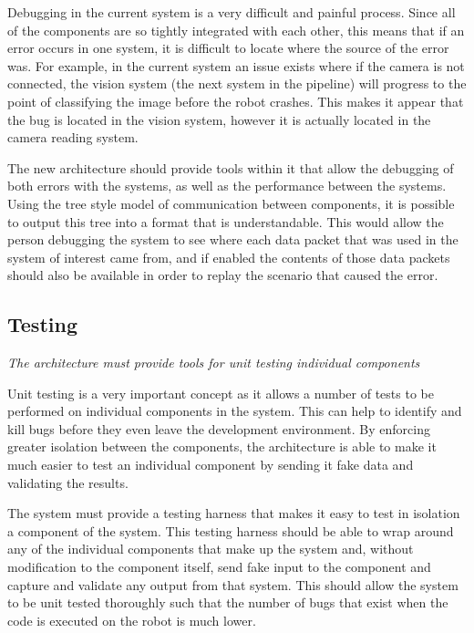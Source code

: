 \documentclass[english,12pt]{scrartcl}
\newcommand{\requirement}[1]{\textit{#1}}
\begin{document}
            Debugging in the current system is a very difficult and painful process. Since all of
            the components are so tightly integrated with each other, this means that if an error
            occurs in one system, it is difficult to locate where the source of the error was. For
            example, in the current system an issue exists where if the camera is not connected, the 
            vision system (the next system in the pipeline) will progress to the point of
            classifying the image before the robot crashes. This makes it appear that the bug is
            located in the vision system, however it is actually located in the camera reading
            system.
             
            The new architecture should provide tools within it that allow the debugging of both
            errors with the systems, as well as the performance between the systems. Using the tree
            style model of communication between components, it is possible to output this tree into
            a format that is understandable. This would allow the person debugging the system to see
            where each data packet that was used in the system of interest came from, and if enabled
            the contents of those data packets should also be available in order to replay the
            scenario that caused the error.
            

        \subsection{Testing}
            \requirement{The architecture must provide tools for unit testing individual components}
            
            Unit testing is a very important concept as it allows a number of tests to be performed
            on individual components in the system. This can help to identify and kill bugs before
            they even leave the development environment. By enforcing greater isolation between the
            components, the architecture is able to make it much easier to test an individual
            component by sending it fake data and validating the results.
            
            The system must provide a testing harness that makes it easy to test in isolation a
            component of the system. This testing harness should be able to wrap around any of the
            individual components that make up the system and, without modification to the component 
            itself, send fake input to the component and capture and validate any output from that
            system. This should allow the system to be unit tested thoroughly such that the number
            of bugs that exist when the code is executed on the robot is much lower.
            
\end{document}
